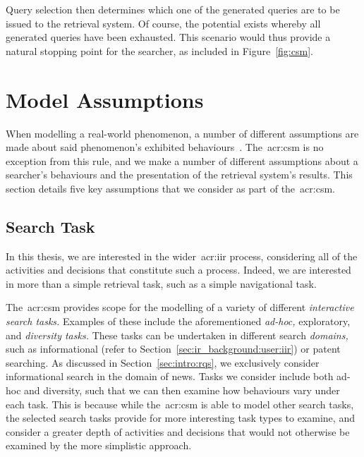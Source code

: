 Query selection then determines which one of the generated queries are to be issued to the retrieval system. Of course, the potential exists whereby all generated queries have been exhausted. This scenario would thus provide a natural stopping point for the searcher, as included in Figure~\ref{fig:csm}.

\section{Model Assumptions}\label{sec:csm:assumptions}
When modelling a real-world phenomenon, a number of different assumptions are made about said phenomenon's exhibited behaviours~\citep{fishwick1995simulation}. The~\gls{acr:csm} is no exception from this rule, and we make a number of different assumptions about a searcher's behaviours and the presentation of the retrieval system's results. This section details five key assumptions that we consider as part of the~\gls{acr:csm}.

\subsection{Search Task}\label{sec:csm:assumptions:task}
In this thesis, we are interested in the wider~\gls{acr:iir} process, considering all of the activities and decisions that constitute such a process. Indeed, we are interested in more than a simple retrieval task, such as a simple navigational task.

The~\gls{acr:csm} provides scope for the modelling of a variety of different \emph{interactive search tasks.} Examples of these include the aforementioned \emph{ad-hoc,} exploratory, and \emph{diversity tasks.} These tasks can be undertaken in different search \emph{domains,} such as informational (refer to Section~\ref{sec:ir_background:user:iir}) or patent searching. As discussed in Section~\ref{sec:intro:rqs}, we exclusively consider informational search in the domain of news. Tasks we consider include both ad-hoc and diversity, such that we can then examine how behaviours vary under each task. This is because while the~\gls{acr:csm} is able to model other search tasks, the selected search tasks provide for more interesting task types to examine, and consider a greater depth of activities and decisions that would not otherwise be examined by the more simplistic approach.

%

